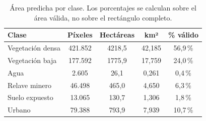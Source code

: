\begin{table}[htbp]
 \centering
 \small
 \setlength{\tabcolsep}{4pt}
 \caption{Área predicha por clase. Los porcentajes se calculan sobre el área válida, no sobre el rectángulo completo.}
 \label{tab:area_clases}
 \begin{tabular}{lcccc}
  \toprule
  Clase & Píxeles & Hectáreas & km² & \% válido \\
  \midrule
  Vegetación densa & 421.852 & 4218{,}5 & 42{,}185 & 56{,}9\,\% \\
  Vegetación baja & 177.592 & 1775{,}9 & 17{,}759 & 24{,}0\,\% \\
  Agua & 2.605 & 26{,}1 & 0{,}261 & 0{,}4\,\% \\
  Relave minero & 46.498 & 465{,}0 & 4{,}650 & 6{,}3\,\% \\
  Suelo expuesto & 13.065 & 130{,}7 & 1{,}306 & 1{,}8\,\% \\
  Urbano & 79.388 & 793{,}9 & 7{,}939 & 10{,}7\,\% \\
  \bottomrule
 \end{tabular}
\end{table}
